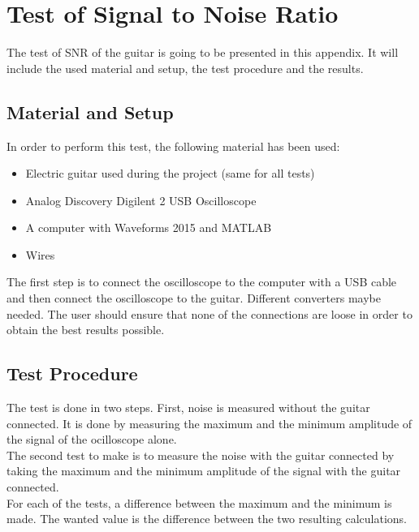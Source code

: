 \chapter{Test of Signal to Noise Ratio}\label{app:test:snr}

The test of SNR of the guitar is going to be presented in this appendix. It will include the used material and setup, the test procedure and the results. \\

\section{Material and Setup}

In order to perform this test, the following material has been used:

\begin{itemize}
	\item Electric guitar used during the project (same for all tests)
	\item Analog Discovery Digilent 2 USB Oscilloscope
	\item A computer with Waveforms 2015 and MATLAB
	\item Wires
\end{itemize}


The first step is to connect the oscilloscope to the computer with a USB cable and then connect the oscilloscope to the guitar. Different converters maybe needed. The user should ensure that none of the connections are loose in order to obtain the best results possible. \\

\section{Test Procedure}

The test is done in two steps. First, noise is measured without the guitar connected. It is done by measuring the maximum and the minimum amplitude of the signal of the ocilloscope alone. \\

The second test to make is to measure the noise with the guitar connected by taking the maximum and the minimum amplitude of the signal with the guitar connected.  \\

For each of the tests, a difference between the maximum and the minimum is made. The wanted value is the difference between the two resulting calculations. \\

